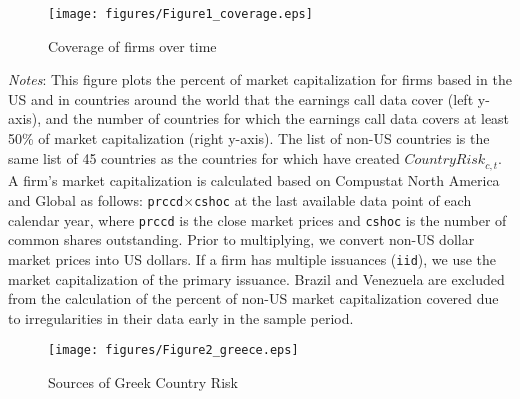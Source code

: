 \documentclass[12pt,oneside,leqno]{article}
\begin{document}
\clearpage
\begin{figure}[!h]
\centering
\caption{Coverage of firms over time}\label{fig:coverage}
\texttt{[image: figures/Figure1\_coverage.eps]}

\end{figure}
\vspace{-.1in}
\begin{minipage}[!h]{.9\textwidth}
\footnotesize\textit{Notes}: This figure plots the percent of market capitalization for firms based in the US and in countries around the world that the earnings call data cover (left y-axis), and the number of countries for which the earnings call data covers at least 50\% of market capitalization (right y-axis). The list of non-US countries is the same list of 45 countries as the countries for which have created $\textit{CountryRisk}_{c,t}$. A firm's market capitalization is calculated based on Compustat North America and Global as follows: \texttt{prccd}$\times$\texttt{cshoc} at the last available data point of each calendar year, where \texttt{prccd} is the close market prices and \texttt{cshoc} is the number of common shares outstanding. Prior to multiplying, we convert non-US dollar market prices into US dollars. If a firm has multiple issuances (\texttt{iid}), we use the market capitalization of the primary issuance. Brazil and Venezuela are excluded from the calculation of the percent of non-US market capitalization covered due to irregularities in their data early in the sample period.
\end{minipage}



\clearpage
\begin{figure}[!h]
\centering\caption{Sources of Greek Country Risk} \label{tab:greece}
\texttt{[image: figures/Figure2\_greece.eps]}
\end{figure}
\end{document}

